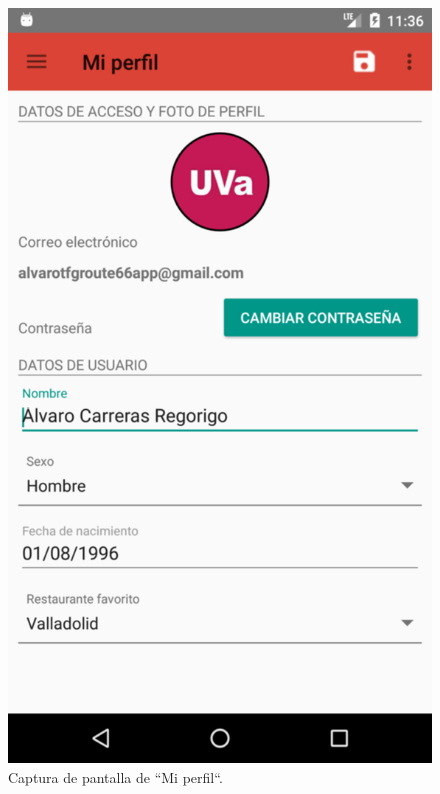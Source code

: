 \documentclass[twoside]{report}
\begin{document}
\begin{figure}[H]
\begin{center}
\includegraphics[scale=0.25]{images/userguide/4.png}
\caption{Captura de pantalla de “Mi perfil“.}
\end{center}
\end{figure}
\end{document}
